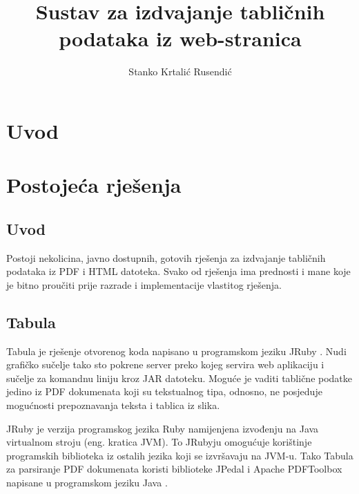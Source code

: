 \documentclass[times, utf8, zavrsni]{fer}
\begin{document}

\title{Sustav za izdvajanje tabličnih podataka iz web-stranica}

\author{Stanko Krtalić Rusendić}

\maketitle


\tableofcontents

\chapter{Uvod}



\chapter{Postojeća rješenja}

\section{Uvod}

Postoji nekolicina, javno dostupnih, gotovih rješenja za izdvajanje tabličnih
podataka iz PDF \cite{pdf_documentation}
i HTML \cite{html_documentation}
datoteka. Svako od rješenja ima prednosti i mane koje je
bitno proučiti prije razrade i implementacije vlastitog rješenja.

\section{Tabula}

Tabula \cite{tabula_repository} je rješenje otvorenog koda napisano u
programskom jeziku JRuby \cite{jruby_documentation}.
Nudi grafičko sučelje tako sto pokrene server preko kojeg servira web
aplikaciju i sučelje za komandnu liniju kroz
JAR \cite{java_language_specification} datoteku. Moguće je vaditi
tablične podatke jedino iz PDF dokumenata koji su tekstualnog tipa, odnosno,
ne posjeduje mogućnosti prepoznavanja teksta i tablica iz slika.

JRuby je verzija programskog jezika Ruby namijenjena izvođenju na Java
virtualnom stroju \cite{java_virtual_machine_specification} (eng. kratica JVM).
To JRubyju omogućuje korištinje
programskih biblioteka iz ostalih jezika koji se izvršavaju na JVM-u. Tako
Tabula za parsiranje PDF dokumenata koristi biblioteke JPedal i Apache
PDFToolbox \cite{apache_pdftoolbox_specification} napisane u programskom
jeziku Java \cite{java_language_specification}.
\end{document}
